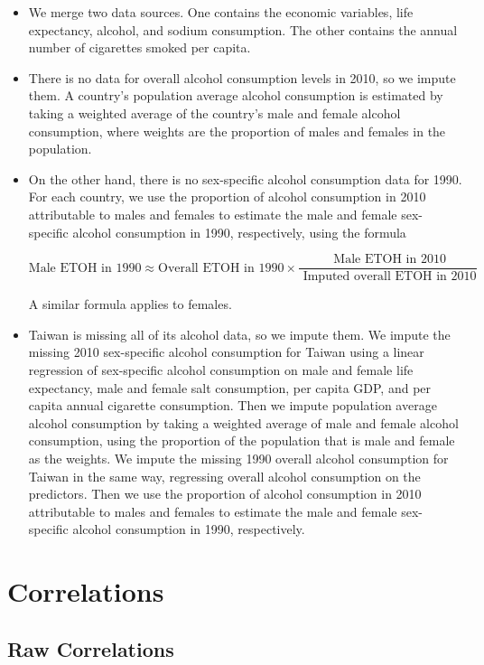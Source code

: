 \documentclass[11pt]{article}\usepackage[]{graphicx}\usepackage[]{color}
\begin{document}
\begin{itemize}
\item We merge two data sources. One contains the economic variables, life expectancy, alcohol, and sodium consumption. The other contains the annual number of cigarettes smoked per capita.
\item There is no data for overall alcohol consumption levels in 2010, so we impute them. 
A country's population average alcohol consumption is estimated by taking a weighted average of the country's male and female alcohol consumption, where weights are the proportion of males and females in the population.  
\item On the other hand, there is no sex-specific alcohol consumption data for 1990.  
For each country, we use the proportion of alcohol consumption in 2010 attributable to males and females to estimate the male and female sex-specific alcohol consumption in 1990, respectively, using the formula

$$\text{Male ETOH in 1990} \approx \text{Overall ETOH in 1990} \times \frac{\text{ Male ETOH in 2010}}{\text{ Imputed overall ETOH in 2010}}$$

\noindent A similar formula applies to females.
\item Taiwan is missing all of its alcohol data, so we impute them.
We impute the missing 2010 sex-specific alcohol consumption for Taiwan using a linear regression of sex-specific alcohol consumption on male and female life expectancy, male and female salt consumption, per capita GDP, and per capita annual cigarette consumption. 
Then we impute population average alcohol consumption by taking a weighted average of male and female alcohol consumption, using the proportion of the population that is male and female as the weights. 
We impute the missing 1990 overall alcohol consumption for Taiwan in the same way, regressing overall alcohol consumption on the predictors. 
Then we use the proportion of alcohol consumption in 2010 attributable to males and females to estimate the male and female sex-specific alcohol consumption in 1990, respectively.
\end{itemize}






\section{Correlations}
\subsection{Raw Correlations}
\end{document}

